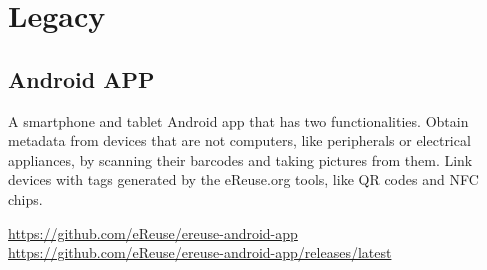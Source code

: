 \documentclass[
]{book}
\begin{document}
\hypertarget{legacy}{%
\section{Legacy}\label{legacy}}

\hypertarget{android-app}{%
\subsection{Android APP}\label{android-app}}

A smartphone and tablet Android app that has two functionalities.
Obtain metadata from devices that are not computers, like peripherals or electrical appliances, by scanning their barcodes and taking pictures from them.
Link devices with tags generated by the eReuse.org tools, like QR codes and NFC chips.

\url{https://github.com/eReuse/ereuse-android-app}
\url{https://github.com/eReuse/ereuse-android-app/releases/latest}

  
\end{document}
